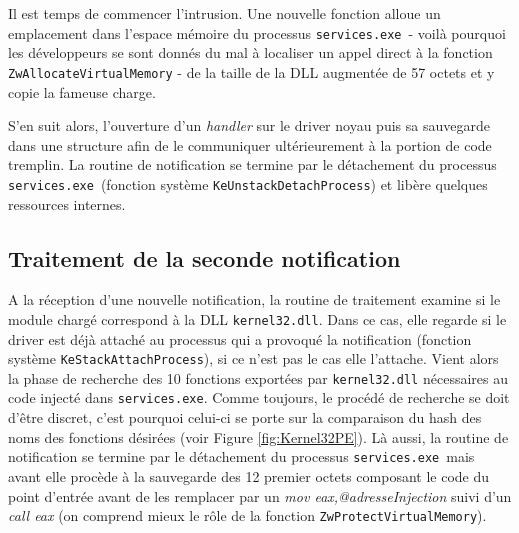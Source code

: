 \documentclass[times,11pt,fullpage]{article}
\newcommand{\service}{\texttt{services.exe}}
\begin{document}
Il est temps de commencer l'intrusion. Une nouvelle fonction alloue un emplacement dans l'espace mémoire du processus \service\ - voilà pourquoi les développeurs se sont donnés du mal à localiser un appel direct à la fonction \texttt{ZwAllocateVirtualMemory} - de la taille de la DLL augmentée de 57 octets et y copie la fameuse charge.  

S'en suit alors, l'ouverture d'un \emph{handler} sur le driver noyau puis sa sauvegarde dans une structure afin de le communiquer ultérieurement à la portion de code tremplin. La routine de notification se termine par le détachement du processus \service\ (fonction système \texttt{KeUnstackDetachProcess}) et libère quelques ressources internes.

\subsection{Traitement de la seconde notification}
A la réception d'une nouvelle notification, la routine de traitement examine si le module chargé correspond à la DLL \texttt{kernel32.dll}. Dans ce cas, elle regarde si le driver est déjà attaché au processus qui a provoqué la notification (fonction système \texttt{KeStackAttachProcess}), si ce n'est pas le cas elle l'attache. Vient alors la phase de recherche des 10 fonctions exportées par \texttt{kernel32.dll} nécessaires au code injecté dans \service. Comme toujours, le procédé de recherche se doit d'être discret, c'est pourquoi celui-ci se porte sur la comparaison du hash des noms des fonctions désirées (voir Figure \ref{fig:Kernel32PE}). Là aussi, la routine de notification se termine par le détachement du processus \service\ mais avant elle procède à la sauvegarde des 12 premier octets composant le code du point d'entrée avant de les remplacer par un \emph{mov eax,@adresseInjection} suivi d'un  \emph{call eax} (on comprend mieux le rôle de la fonction \texttt{ZwProtectVirtualMemory}).
\end{document}
